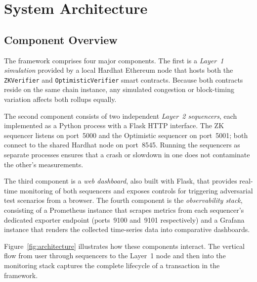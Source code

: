 \documentclass[
]{elteikthesis}[2024/04/26]
\begin{document}
\section{System Architecture}

\subsection{Component Overview}

The framework comprises four major components. The first is a \textit{Layer~1 simulation} provided by a local Hardhat Ethereum node that hosts both the \texttt{ZKVerifier} and \texttt{OptimisticVerifier} smart contracts. Because both contracts reside on the same chain instance, any simulated congestion or block-timing variation affects both rollups equally.

The second component consists of two independent \textit{Layer~2 sequencers}, each implemented as a Python process with a Flask HTTP interface. The ZK sequencer listens on port~5000 and the Optimistic sequencer on port~5001; both connect to the shared Hardhat node on port~8545. Running the sequencers as separate processes ensures that a crash or slowdown in one does not contaminate the other's measurements.

The third component is a \textit{web dashboard}, also built with Flask, that provides real-time monitoring of both sequencers and exposes controls for triggering adversarial test scenarios from a browser. The fourth component is the \textit{observability stack}, consisting of a Prometheus instance that scrapes metrics from each sequencer's dedicated exporter endpoint (ports~9100 and~9101 respectively) and a Grafana instance that renders the collected time-series data into comparative dashboards.

Figure~\ref{fig:architecture} illustrates how these components interact. The vertical flow from user through sequencers to the Layer~1 node and then into the monitoring stack captures the complete lifecycle of a transaction in the framework.
\end{document}

